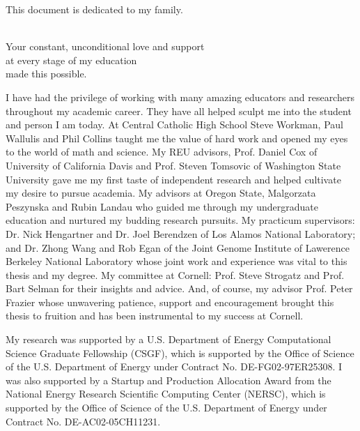 \documentclass[phd,tocprelim]{cornell}
\begin{document}
\begin{dedication}
This document is dedicated to my family.

\ \\

Your constant, unconditional love and support \\
at every stage of my education \\
made this possible.
\end{dedication}

\begin{acknowledgements}
I have had the privilege of working with many amazing educators and researchers throughout my academic career. They have all helped sculpt me into the student and person I am today. At Central Catholic High School Steve Workman, Paul Wallulis and Phil Collins taught me the value of hard work and opened my eyes to the world of math and science. My REU advisors, Prof. Daniel Cox of University of California Davis and Prof. Steven Tomsovic of Washington State University gave me my first taste of independent research and helped cultivate my desire to pursue academia. My advisors at Oregon State, Malgorzata Peszynska and Rubin Landau who guided me through my undergraduate education and nurtured my budding research pursuits. My practicum supervisors: Dr. Nick Hengartner and Dr. Joel Berendzen of Los Alamos National Laboratory; and Dr. Zhong Wang and Rob Egan of the Joint Genome Institute of Lawerence Berkeley National Laboratory whose joint work and experience was vital to this thesis and my degree. My committee at Cornell: Prof. Steve Strogatz and Prof. Bart Selman for their insights and advice. And, of course, my advisor Prof. Peter Frazier whose unwavering patience, support and encouragement brought this thesis to fruition and has been instrumental to my success at Cornell.

My research was supported by a U.S. Department of Energy Computational Science Graduate Fellowship (CSGF), which is supported by the Office of Science of the U.S. Department of Energy under Contract No. DE-FG02-97ER25308. I was also supported by a Startup and Production Allocation Award from the National Energy Research Scientific Computing Center (NERSC), which is supported by the Office of Science of the U.S. Department of Energy under Contract No. DE-AC02-05CH11231.
\end{acknowledgements}

\contentspage
\tablelistpage
\figurelistpage

\normalspacing \setcounter{page}{1} 
\pagestyle{cornell} \addtolength{\parskip}{0.5\baselineskip}
\end{document}
